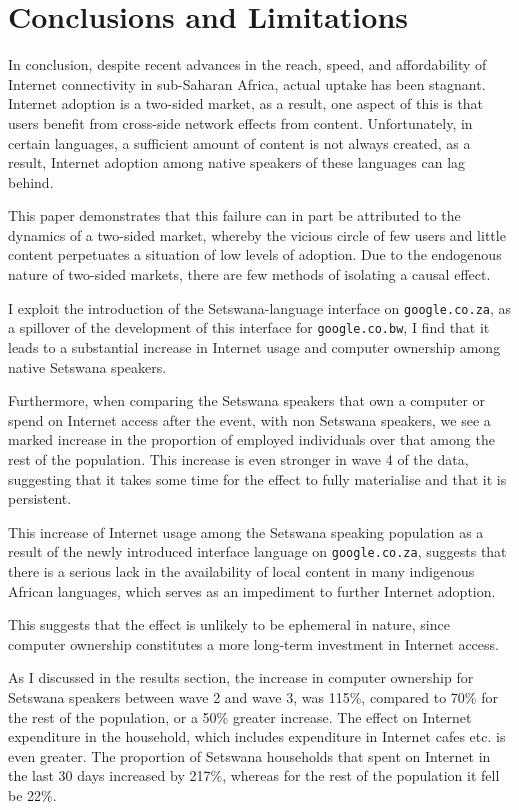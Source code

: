 \documentclass[a4paper,british]{article}\usepackage[]{graphicx}\usepackage[]{color}
\newcommand{\code}[1]{\texttt{#1}}
\begin{document}
\section{Conclusions and Limitations}

\label{sec:conclusions}In conclusion, despite recent advances in
the reach, speed, and affordability of Internet connectivity in sub-Saharan
Africa, actual uptake has been stagnant. Internet adoption is a two-sided
market, as a result, one aspect of this is that users benefit from
cross-side network effects from content. Unfortunately, in certain
languages, a sufficient amount of content is not always created, as
a result, Internet adoption among native speakers of these languages
can lag behind.

This paper demonstrates that this failure can in part be attributed
to the dynamics of a two-sided market, whereby the vicious circle
of few users and little content perpetuates a situation of low levels
of adoption. Due to the endogenous nature of two-sided markets, there
are few methods of isolating a causal effect.

I exploit the introduction of the Setswana-language interface on \code{google.co.za},
as a spillover of the development of this interface for \code{google.co.bw},
I find that it leads to a substantial increase in Internet usage and
computer ownership among native Setswana speakers.

Furthermore, when comparing the Setswana speakers that own a computer
or spend on Internet access after the event, with non Setswana speakers,
we see a marked increase in the proportion of employed individuals
over that among the rest of the population. This increase is even
stronger in wave 4 of the data, suggesting that it takes some time
for the effect to fully materialise and that it is persistent.

This increase of Internet usage among the Setswana speaking population
as a result of the newly introduced interface language on \code{google.co.za},
suggests that there is a serious lack in the availability of local
content in many indigenous African languages, which serves as an impediment
to further Internet adoption. 

 This suggests that the effect is unlikely to be ephemeral in nature,
since computer ownership constitutes a more long-term investment in
Internet access.

As I discussed in the results section, the increase in computer ownership
for Setswana speakers between wave 2 and wave 3, was 115\%, compared
to 70\% for the rest of the population, or a 50\% greater increase.
The effect on Internet expenditure in the household, which includes
expenditure in Internet cafes etc. is even greater. The proportion
of Setswana households that spent on Internet in the last 30 days
increased by 217\%, whereas for the rest of the population it fell
be 22\%.
\end{document}
